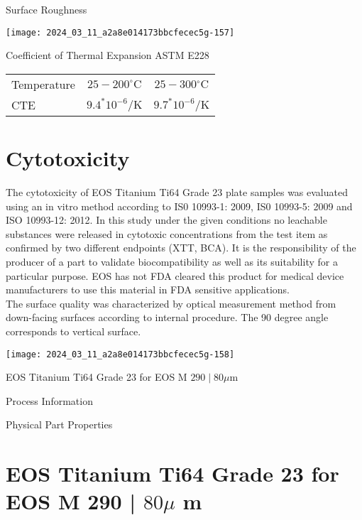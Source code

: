 \documentclass[10pt]{article}
\begin{document}
Surface Roughness

\begin{center}
\texttt{[image: 2024\_03\_11\_a2a8e014173bbcfecec5g-157]}
\end{center}

Coefficient of Thermal Expansion ASTM E228

\begin{center}
\begin{tabular}{lcc}
\hline
Temperature & $25-200^{\circ} \mathrm{C}$ & $25-300{ }^{\circ} \mathrm{C}$ \\
\cline { 1 - 3 }
CTE & $9.4^{*} 10^{-6} / \mathrm{K}$ & $9.7^{*} 10^{-6} / \mathrm{K}$ \\
\hline
\end{tabular}
\end{center}

\section*{Cytotoxicity}
The cytotoxicity of EOS Titanium Ti64 Grade 23 plate samples was evaluated using an in vitro method according to IS0 10993-1: 2009, IS0 10993-5: 2009 and ISO 10993-12: 2012. In this study under the given conditions no leachable substances were released in cytotoxic concentrations from the test item as confirmed by two different endpoints (XTT, BCA). It is the responsibility of the producer of a part to validate biocompatibility as well as its suitability for a particular purpose. EOS has not FDA cleared this product for medical device manufacturers to use this material in FDA sensitive applications.\\
The surface quality was characterized by optical measurement method from down-facing surfaces according to internal procedure. The 90 degree angle corresponds to vertical surface.

\begin{center}
\texttt{[image: 2024\_03\_11\_a2a8e014173bbcfecec5g-158]}
\end{center}

EOS Titanium Ti64 Grade 23 for EOS M $290 \mid 80 \mu \mathrm{m}$

Process Information

Physical Part Properties

\section*{EOS Titanium Ti64 Grade 23 for EOS M 290 | $80 \mu$ m}
\end{document}
